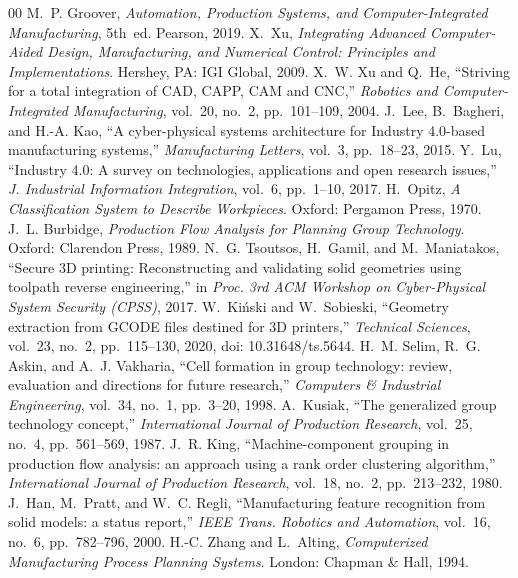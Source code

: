 \documentclass[conference]{IEEEtran}
\begin{document}
\renewcommand{\IEEEbibitemsep}{0pt plus .5pt}
\begin{thebibliography}{00}
 M.~P. Groover, \emph{Automation, Production Systems, and Computer-Integrated Manufacturing}, 5th~ed. Pearson, 2019.
 X.~Xu, \emph{Integrating Advanced Computer-Aided Design, Manufacturing, and Numerical Control: Principles and Implementations}. Hershey, PA: IGI Global, 2009.
 X.~W. Xu and Q.~He, ``Striving for a total integration of CAD, CAPP, CAM and CNC,'' \emph{Robotics and Computer-Integrated Manufacturing}, vol.~20, no.~2, pp.~101--109, 2004.
 J.~Lee, B.~Bagheri, and H.-A. Kao, ``A cyber-physical systems architecture for Industry 4.0-based manufacturing systems,'' \emph{Manufacturing Letters}, vol.~3, pp.~18--23, 2015.
 Y.~Lu, ``Industry 4.0: A survey on technologies, applications and open research issues,'' \emph{J. Industrial Information Integration}, vol.~6, pp.~1--10, 2017.
 H.~Opitz, \emph{A Classification System to Describe Workpieces}. Oxford: Pergamon Press, 1970.
 J.~L. Burbidge, \emph{Production Flow Analysis for Planning Group Technology}. Oxford: Clarendon Press, 1989.
 N.~G. Tsoutsos, H.~Gamil, and M.~Maniatakos, ``Secure 3D printing: Reconstructing and validating solid geometries using toolpath reverse engineering,'' in \emph{Proc. 3rd ACM Workshop on Cyber-Physical System Security (CPSS)}, 2017.
 W.~Kiński and W.~Sobieski, ``Geometry extraction from GCODE files destined for 3D printers,'' \emph{Technical Sciences}, vol.~23, no.~2, pp.~115--130, 2020, doi: 10.31648/ts.5644.
 H.~M. Selim, R.~G. Askin, and A.~J. Vakharia, ``Cell formation in group technology: review, evaluation and directions for future research,'' \emph{Computers \& Industrial Engineering}, vol.~34, no.~1, pp.~3--20, 1998.
 A.~Kusiak, ``The generalized group technology concept,'' \emph{International Journal of Production Research}, vol.~25, no.~4, pp.~561--569, 1987.
 J.~R. King, ``Machine-component grouping in production flow analysis: an approach using a rank order clustering algorithm,'' \emph{International Journal of Production Research}, vol.~18, no.~2, pp.~213--232, 1980.
 J.~Han, M.~Pratt, and W.~C. Regli, ``Manufacturing feature recognition from solid models: a status report,'' \emph{IEEE Trans. Robotics and Automation}, vol.~16, no.~6, pp.~782--796, 2000.
 H.-C. Zhang and L.~Alting, \emph{Computerized Manufacturing Process Planning Systems}. London: Chapman \& Hall, 1994.

\end{thebibliography}
\end{document}
